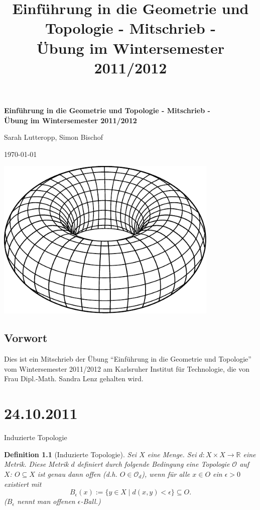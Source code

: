 \documentclass[a4paper,11pt,notitlepage]{report}
\title{\textbf{{Einführung in die Geometrie und Topologie - Mitschrieb -} \\[5ex] 
    {\Large Übung im Wintersemester 2011/2012\\[5ex]}}}
\author{\myname{Sarah Lutteropp, Simon Bischof}}
\newtheorem{definition}{Definition}[chapter]
\newcommand{\R}{{\ensuremath{\mathbb{R}}}}
\newcommand{\OO}{{\ensuremath{\mathcal{O}}}}
\begin{document}
\begin{titlepage}
	\begin{center}	
		\LARGE \textbf{{Einführung in die Geometrie und Topologie - Mitschrieb -} \\[5ex] 
    		{\Large Übung im Wintersemester 2011/2012\\[5ex]}}
	\end{center}
	\begin{center}
		\Large Sarah Lutteropp, Simon Bischof
	\end{center}
	\begin{center}
		\today
	\end{center}
	\vspace{2cm}
	\begin{center}
		\includegraphics[width=0.8\textwidth]{torus2.pdf}
	\end{center}
\end{titlepage}
\setcounter{tocdepth}{1}
\tableofcontents

\section*{Vorwort}
Dies ist ein Mitschrieb der Übung “Einführung in die Geometrie und Topologie” vom Wintersemester 2011/2012 am Karlsruher Institut für Technologie, die von Frau Dipl.-Math. Sandra Lenz gehalten wird.

\chapter{24.10.2011}

\begin{section}{Induzierte Topologie}
	\begin{definition}[Induzierte Topologie]
		Sei $X$ eine Menge. Sei $d \colon X \times X \rightarrow \R$ eine Metrik. Diese Metrik $d$ definiert durch folgende Bedingung eine Topologie $\OO$ auf $X$:
		\newline
		$O \subseteq X$ ist genau dann offen (d.h. $O \in \OO_d$), wenn für alle $x \in O$ ein $\epsilon > 0$ existiert mit
		$$
			B_\epsilon (x) := \{y \in X \mid d(x,y) < \epsilon\} \subseteq O.
		$$
		($B_\epsilon$ nennt man offenen $\epsilon$-Ball.)
	\end{definition}
\end{section}
\end{document}
